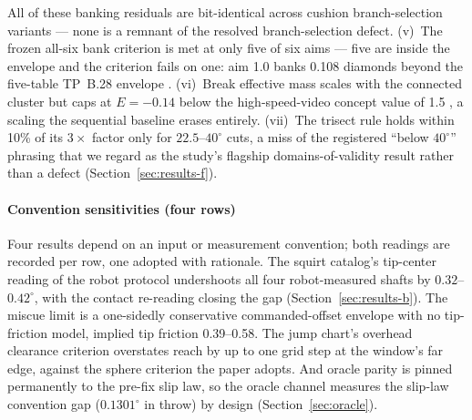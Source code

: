 All of these banking
residuals are bit-identical across cushion branch-selection variants ---
none is a remnant of the resolved branch-selection defect.
(v)~The frozen all-six bank criterion is met at only five of six aims
--- five are inside the envelope and the criterion fails on one: aim 1.0
banks 0.108 diamonds beyond the five-table TP~B.28 envelope
\citep{alciatore_tp_b28}.
(vi)~Break effective mass scales with the connected cluster but caps at
$E = -0.14$ below the high-speed-video concept value of 1.5
\citep{alciatore_hsv_catalog}, a scaling the sequential baseline erases
entirely. (vii)~The trisect rule
holds within 10\% of its $3\times$ factor only for $22.5$--$40^\circ$
cuts, a miss of the registered ``below $40^\circ$'' phrasing that we
regard as the study's flagship domains-of-validity result rather than a
defect (Section~\ref{sec:results-f}).

\paragraph{Convention sensitivities (four rows)}
Four results depend on an input or measurement convention; both readings
are recorded per row, one adopted with rationale. The squirt catalog's
tip-center reading of the robot protocol undershoots all four
robot-measured shafts by $0.32$--$0.42^\circ$, with the contact
re-reading closing the gap (Section~\ref{sec:results-b}). The miscue limit is a one-sidedly
conservative commanded-offset envelope with no tip-friction model,
implied tip friction 0.39--0.58. The
jump chart's overhead clearance criterion overstates reach by up to one
grid step at the window's far edge, against the sphere criterion the
paper adopts. And oracle parity is
pinned permanently to the pre-fix slip law, so the oracle channel
measures the slip-law convention gap ($0.1301^\circ$ in throw) by design
(Section~\ref{sec:oracle}).

